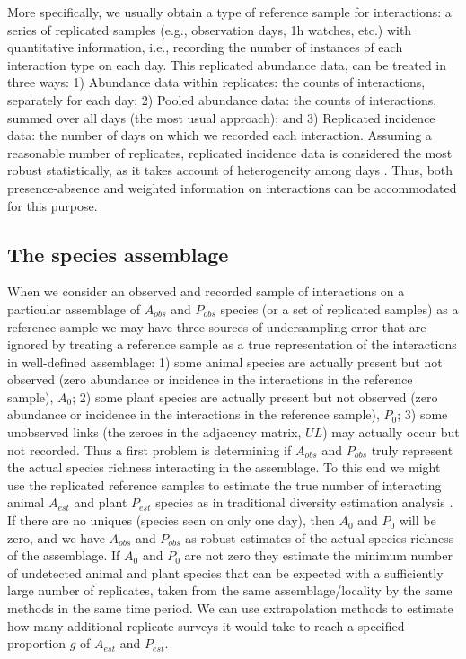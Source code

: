 \documentclass[12pt]{article}
\begin{document}
More specifically, we usually obtain a type of reference sample \citep{Chao:2014wm} for interactions: a series of replicated samples (e.g., observation days, 1h watches, etc.) with quantitative information, i.e., recording the number of instances of each interaction type on each day. This replicated abundance data, can be treated in three ways: 1) Abundance data within replicates: the counts of interactions, separately for each day; 2) Pooled abundance data: the counts of interactions, summed over all days (the most usual approach); and 3) Replicated incidence data: the number of days on which we recorded each interaction. Assuming a reasonable number of replicates, replicated incidence data is considered the most robust statistically, as it takes account of heterogeneity among days \citep{Colwell:2004fi,Colwell:2012fc,Chao:2014wm}. Thus, both presence-absence and weighted information on interactions can be accommodated for this purpose. 

\subsection*{The species assemblage}

When we consider an observed and recorded sample of interactions on a particular assemblage of $A_{obs}$ and $P_{obs}$ species (or a set of replicated samples) as a reference sample \citep{Chao:2014wm} we may have three sources of undersampling error that are ignored by treating a reference sample as a true representation of the interactions in well-defined assemblage: 1) some animal species are actually present but not observed (zero abundance or incidence in the interactions in the reference sample), $A_0$; 2) some plant species are actually present but not observed (zero abundance or incidence in the interactions in the reference sample), $P_0$; 3) some unobserved links (the zeroes in the adjacency matrix, $UL$) may actually occur but not recorded. Thus a first problem is determining if $A_{obs}$ and $P_{obs}$ truly represent the actual species richness interacting in the assemblage. To this end we might use the replicated reference samples to estimate the true number of interacting animal $A_{est}$ and plant $P_{est}$ species as in traditional diversity estimation analysis \citep{Chao:2014wm}.  If there are no uniques (species seen on only one day), then $A_0$ and $P_0$ will be zero, and we have $A_{obs}$ and $P_{obs}$ as robust estimates of the actual species richness of the assemblage. If $A_0$ and $P_0$ are not zero they estimate the minimum number of undetected animal and plant species that can be expected with a sufficiently large number of replicates, taken from the same assemblage/locality by the same methods in the same time period. We can use extrapolation methods \citep{Colwell:2012fc} to estimate how many additional replicate surveys it would take to reach a specified proportion $g$ of $A_{est}$ and $P_{est}$.
\end{document}
